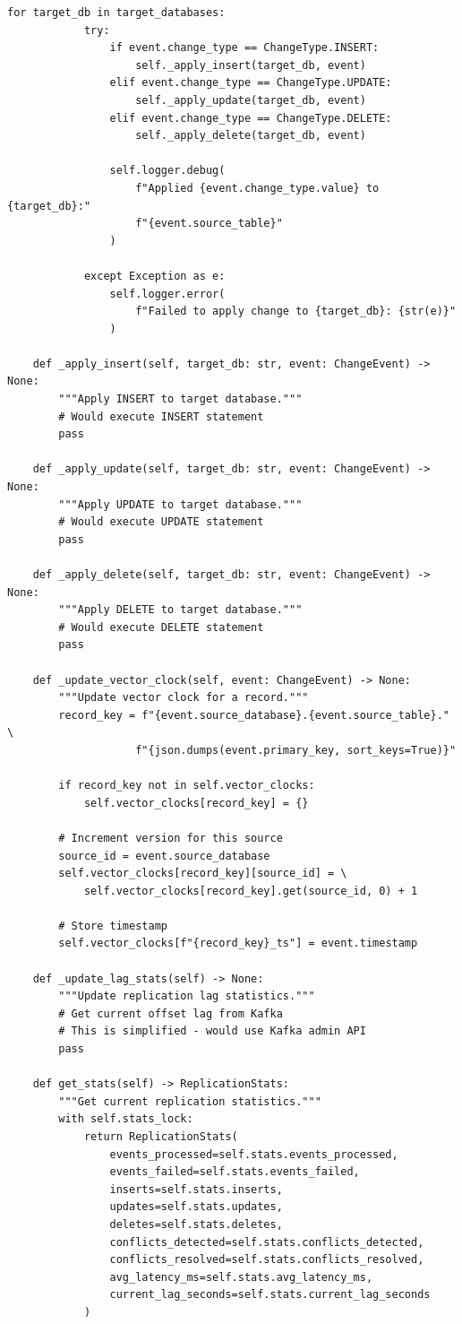 \begin{lstlisting}[style=python, caption=CDCProcessor with Change Stream Handling]
        for target_db in target_databases:
            try:
                if event.change_type == ChangeType.INSERT:
                    self._apply_insert(target_db, event)
                elif event.change_type == ChangeType.UPDATE:
                    self._apply_update(target_db, event)
                elif event.change_type == ChangeType.DELETE:
                    self._apply_delete(target_db, event)

                self.logger.debug(
                    f"Applied {event.change_type.value} to {target_db}:"
                    f"{event.source_table}"
                )

            except Exception as e:
                self.logger.error(
                    f"Failed to apply change to {target_db}: {str(e)}"
                )

    def _apply_insert(self, target_db: str, event: ChangeEvent) -> None:
        """Apply INSERT to target database."""
        # Would execute INSERT statement
        pass

    def _apply_update(self, target_db: str, event: ChangeEvent) -> None:
        """Apply UPDATE to target database."""
        # Would execute UPDATE statement
        pass

    def _apply_delete(self, target_db: str, event: ChangeEvent) -> None:
        """Apply DELETE to target database."""
        # Would execute DELETE statement
        pass

    def _update_vector_clock(self, event: ChangeEvent) -> None:
        """Update vector clock for a record."""
        record_key = f"{event.source_database}.{event.source_table}." \
                    f"{json.dumps(event.primary_key, sort_keys=True)}"

        if record_key not in self.vector_clocks:
            self.vector_clocks[record_key] = {}

        # Increment version for this source
        source_id = event.source_database
        self.vector_clocks[record_key][source_id] = \
            self.vector_clocks[record_key].get(source_id, 0) + 1

        # Store timestamp
        self.vector_clocks[f"{record_key}_ts"] = event.timestamp

    def _update_lag_stats(self) -> None:
        """Update replication lag statistics."""
        # Get current offset lag from Kafka
        # This is simplified - would use Kafka admin API
        pass

    def get_stats(self) -> ReplicationStats:
        """Get current replication statistics."""
        with self.stats_lock:
            return ReplicationStats(
                events_processed=self.stats.events_processed,
                events_failed=self.stats.events_failed,
                inserts=self.stats.inserts,
                updates=self.stats.updates,
                deletes=self.stats.deletes,
                conflicts_detected=self.stats.conflicts_detected,
                conflicts_resolved=self.stats.conflicts_resolved,
                avg_latency_ms=self.stats.avg_latency_ms,
                current_lag_seconds=self.stats.current_lag_seconds
            )


\end{lstlisting}
